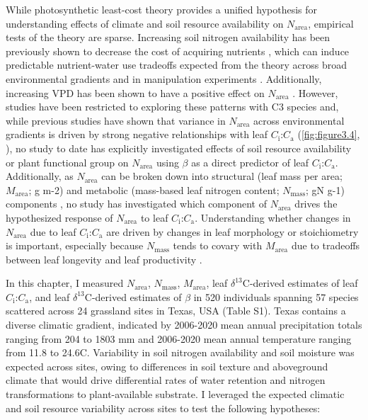 While photosynthetic least-cost theory provides a unified hypothesis for understanding effects of climate and soil resource availability on $N_\mathrm{area}$, empirical tests of the theory are sparse. Increasing soil nitrogen availability has been previously shown to decrease the cost of acquiring nutrients , which can induce predictable nutrient-water use tradeoffs expected from the theory across broad environmental gradients  and in manipulation experiments . Additionally, increasing VPD has been shown to have a positive effect on $N_\mathrm{area}$ . However, studies have been restricted to exploring these patterns with C3 species and, while previous studies have shown that variance in $N_\mathrm{area}$ across environmental gradients is driven by strong negative relationships with leaf $C_\mathrm{i}$:$C_\mathrm{a}$ (\ref{fig:figure3.4}, ), no study to date has explicitly investigated effects of soil resource availability or plant functional group on $N_\mathrm{area}$ using $\beta$ as a direct predictor of leaf $C_\mathrm{i}$:$C_\mathrm{a}$. Additionally, as $N_\mathrm{area}$ can be broken down into structural (leaf mass per area; $M_\mathrm{area}$; g m-2) and metabolic (mass-based leaf nitrogen content; $N_\mathrm{mass}$; gN g-1) components , no study has investigated which component of $N_\mathrm{area}$ drives the hypothesized response of $N_\mathrm{area}$ to leaf $C_\mathrm{i}$:$C_\mathrm{a}$. Understanding whether changes in $N_\mathrm{area}$ due to leaf $C_\mathrm{i}$:$C_\mathrm{a}$ are driven by changes in leaf morphology or stoichiometry is important, especially because $N_\mathrm{mass}$ tends to covary with $M_\mathrm{area}$ due to tradeoffs between leaf longevity and leaf productivity .

In this chapter, I measured $N_\mathrm{area}$, $N_\mathrm{mass}$, $M_\mathrm{area}$, leaf $\delta^{13}$C-derived estimates of leaf $C_\mathrm{i}$:$C_\mathrm{a}$, and leaf $\delta^{13}$C-derived estimates of $\beta$ in 520 individuals spanning 57 species scattered across 24 grassland sites in Texas, USA (Table S1). Texas contains a diverse climatic gradient, indicated by 2006-2020 mean annual precipitation totals ranging from 204 to 1803 mm and 2006-2020 mean annual temperature ranging from 11.8\textdegree{} to 24.6\textdegree{}C. Variability in soil nitrogen availability and soil moisture was expected across sites, owing to differences in soil texture and aboveground climate that would drive differential rates of water retention and nitrogen transformations to plant-available substrate. I leveraged the expected climatic and soil resource variability across sites to test the following hypotheses:

